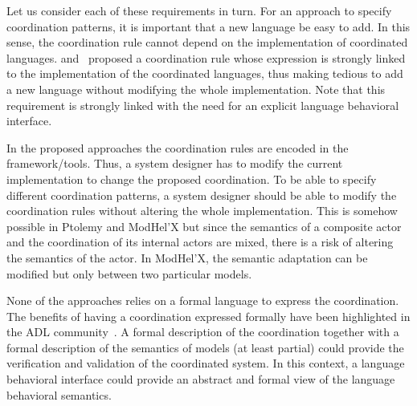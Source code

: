 Let us consider each of these requirements in turn. For an approach to specify coordination patterns, it is important that a new language be easy to add. In this sense, the coordination rule cannot depend on the implementation of coordinated languages. \cite{dinatale} and~\cite{mascotbib} proposed a coordination rule whose expression is strongly linked to the implementation of the coordinated languages, thus making tedious to add a new language without modifying the whole implementation. Note that this requirement is strongly linked with the need for an explicit language behavioral interface.
	
In the proposed approaches the coordination rules are encoded in the framework/tools. Thus, a system designer has to modify the current implementation to change the proposed coordination. To be able to specify different coordination patterns, a system designer should be able to modify the coordination rules without altering the whole implementation. This is somehow possible in Ptolemy and ModHel'X but since the semantics of a composite actor and the coordination of its internal actors are mixed, there is a risk of altering the semantics of the actor. In ModHel'X, the semantic adaptation can be modified but only between two particular models.
	
None of the approaches relies on a formal language to express the coordination. The benefits of having a coordination expressed formally have been highlighted in the ADL community~\cite{wrightbib,rapidebib}. A formal description of the coordination together with a formal description of the semantics of models (at least partial) could provide the verification and validation of the coordinated system. In this context, a language behavioral interface could provide an abstract and formal view of the language behavioral semantics.


